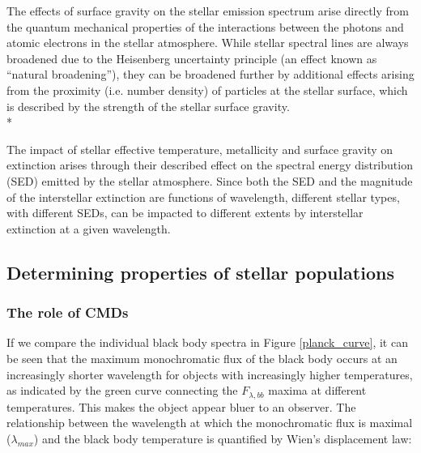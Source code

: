 \documentclass[12pt, a4paper]{report}
\begin{document}
The effects of surface gravity on the stellar emission spectrum arise directly from the quantum mechanical properties of the interactions between the photons and atomic electrons in the stellar atmosphere. While stellar spectral lines are always broadened due to the Heisenberg uncertainty principle (an effect known as ``natural broadening''), they can be broadened further by additional effects arising from the proximity (i.e. number density) of particles at the stellar surface, which is described by the strength of the stellar surface gravity. \\*


The impact of stellar effective temperature, metallicity and surface gravity on extinction arises through their described effect on the spectral energy distribution (SED) emitted by the stellar atmosphere. Since both the SED and the magnitude of the interstellar extinction are functions of wavelength, different stellar types, with different SEDs, can be impacted to different extents by interstellar extinction at a given wavelength.

\subsection{Determining properties of stellar populations}
\subsubsection{The role of CMDs} \label{CMDs_intro}
If we compare the individual black body spectra in Figure \ref{planck_curve}, it can be seen that the maximum monochromatic flux of the black body occurs at an increasingly shorter wavelength for objects with increasingly higher temperatures, as indicated by the green curve connecting the $F_{\lambda,bb}$ maxima at different temperatures. This makes the object appear bluer to an observer. The relationship between the wavelength at which the monochromatic flux is maximal ($\lambda_{max}$) and the black body temperature is quantified by Wien's displacement law:
\end{document}
